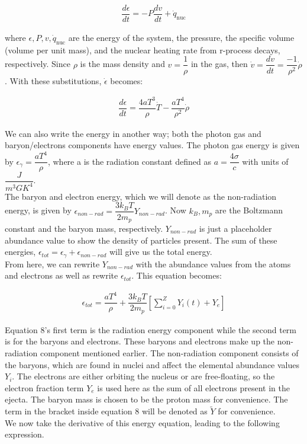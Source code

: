 \documentclass[11pt,a4paper]{article}
\begin{document}
\begin{align}
	\dfrac{d \epsilon}{dt} = -P \dfrac{dv}{dt} + \dot{q}_\mathrm{nuc}
\end{align}

where $\epsilon, P, v, \dot{q}_\mathrm{nuc}$ are the energy of the system, the pressure, the specific volume (volume per unit mass), and the nuclear heating rate from r-process decays, respectively. Since $\rho$ is the mass density and $ v = \dfrac{1}{\rho} $ in the gas, then $ \dot{v} = \dfrac{dv}{dt} =  \dfrac{-1}{\rho ^2}\dot{\rho} $. With these substitutions, $\dot{\epsilon}$ becomes: 

\begin{align}
	\dfrac{d \epsilon}{dt} = \dfrac{4a T^3}{\rho} \dot{T} - 			\dfrac{a T^4}{\rho^2}\dot{\rho} 
\end{align}

We can also write the energy in another way; both the photon gas and baryon/electrons components have energy values. The photon gas energy is given by $\epsilon_{\gamma} =\dfrac{a T^4}{\rho}$, where a is the radiation constant defined as $a = \dfrac{4 \sigma}{c}$ with units of $\dfrac{J}{m^3 {GK}^4}$.\\

The baryon and electron energy, which we will denote as the non-radiation energy, is given by $\epsilon_{non-rad} = \dfrac{3 k_B T}{2 m_p} Y_{non-rad}$. Now $k_B, m_p$ are the Boltzmann constant and the baryon mass, respectively. $Y_{non-rad}$ is just a placeholder abundance value to show the density of particles present. The sum of these energies, $\epsilon_{tot} = \epsilon_\gamma + \epsilon_{non-rad}$ will give us the total energy. 
\\

From here, we can rewrite $Y_{non-rad}$ with the abundance values from the atoms and electrons as well as rewrite $\epsilon_{tot}$. This equation becomes:  

\begin{align}
	\epsilon_{tot} = \dfrac{a T^4}{\rho} + \dfrac{3 k_B T}{2 m_p} \left[\sum_{i=0}^{Z} Y_i(t) + Y_e \right] 
\end{align}

Equation 8's first term is the radiation energy component while the second term is for the baryons and electrons. These baryons and electrons make up the non-radiation component mentioned earlier. The non-radiation component consists of the baryons, which are found in nuclei and affect the elemental abundance values $Y_i$. The electrons are either orbiting the nucleus or are free-floating, so the electron fraction term $Y_e$ is used here as the sum of all electrons present in the ejecta. The baryon mass is chosen to be the proton mass for convenience. The term in the bracket inside equation 8 will be denoted as $\tilde{Y}$ for convenience.\\
We now take the derivative of this energy equation, leading to the following expression. \\
\end{document}
